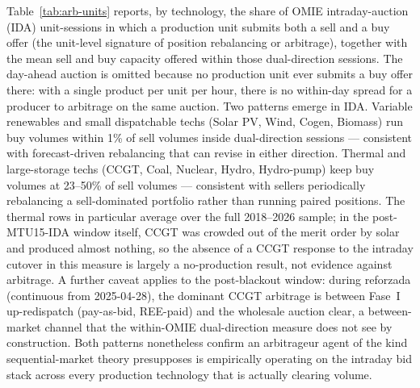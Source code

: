 \documentclass[11pt]{article}
\begin{document}
Table~\ref{tab:arb-units} reports, by technology, the share of OMIE intraday-auction (IDA) unit-sessions in which a production unit submits both a sell and a buy offer (the unit-level signature of position rebalancing or arbitrage), together with the mean sell and buy capacity offered within those dual-direction sessions. The day-ahead auction is omitted because no production unit ever submits a buy offer there: with a single product per unit per hour, there is no within-day spread for a producer to arbitrage on the same auction. Two patterns emerge in IDA. Variable renewables and small dispatchable techs (Solar PV, Wind, Cogen, Biomass) run buy volumes within 1\% of sell volumes inside dual-direction sessions --- consistent with forecast-driven rebalancing that can revise in either direction. Thermal and large-storage techs (CCGT, Coal, Nuclear, Hydro, Hydro-pump) keep buy volumes at 23--50\% of sell volumes --- consistent with sellers periodically rebalancing a sell-dominated portfolio rather than running paired positions. The thermal rows in particular average over the full 2018--2026 sample; in the post-MTU15-IDA window itself, CCGT was crowded out of the merit order by solar and produced almost nothing, so the absence of a CCGT response to the intraday cutover in this measure is largely a no-production result, not evidence against arbitrage. A further caveat applies to the post-blackout window: during reforzada (continuous from 2025-04-28), the dominant CCGT arbitrage is between Fase~I up-redispatch (pay-as-bid, REE-paid) and the wholesale auction clear, a between-market channel that the within-OMIE dual-direction measure does not see by construction. Both patterns nonetheless confirm an arbitrageur agent of the kind sequential-market theory presupposes is empirically operating on the intraday bid stack across every production technology that is actually clearing volume.
\end{document}
